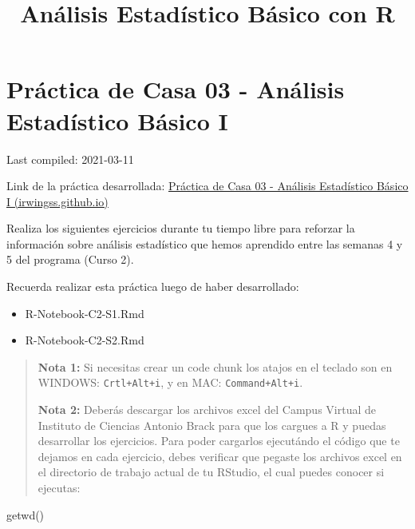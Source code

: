 \documentclass[
]{article}
\title{Análisis Estadístico Básico con R}
\author{}
\date{\vspace{-2.5em}}
\newenvironment{Shaded}{}{}
\newcommand{\FunctionTok}[1]{\textcolor[rgb]{0.02,0.16,0.49}{#1}}
\newcommand{\NormalTok}[1]{#1}
\begin{document}
\maketitle

{
\setcounter{tocdepth}{2}
\tableofcontents
}
\hypertarget{pruxe1ctica-de-casa-03---anuxe1lisis-estaduxedstico-buxe1sico-i}{%
\section{\texorpdfstring{\textbf{Práctica de Casa 03 - Análisis
Estadístico Básico
I}}{Práctica de Casa 03 - Análisis Estadístico Básico I}}\label{pruxe1ctica-de-casa-03---anuxe1lisis-estaduxedstico-buxe1sico-i}}

Last compiled: 2021-03-11

Link de la práctica desarrollada:
\href{https://irwingss.github.io/IrwingRLab/PractCasa03-full.html}{Práctica
de Casa 03 - Análisis Estadístico Básico I (irwingss.github.io)}

Realiza los siguientes ejercicios durante tu tiempo libre para reforzar
la información sobre análisis estadístico que hemos aprendido entre las
semanas 4 y 5 del programa (Curso 2).

Recuerda realizar esta práctica luego de haber desarrollado:

\begin{itemize}
\item
  R-Notebook-C2-S1.Rmd
\item
  R-Notebook-C2-S2.Rmd
\end{itemize}

\begin{quote}
\textbf{Nota 1:} Si necesitas crear un code chunk los atajos en el
teclado son en WINDOWS: \texttt{Crtl+Alt+i}, y en MAC:
\texttt{Command+Alt+i}.

\textbf{Nota 2:} Deberás descargar los archivos excel del Campus Virtual
de Instituto de Ciencias Antonio Brack para que los cargues a R y puedas
desarrollar los ejercicios. Para poder cargarlos ejecutándo el código
que te dejamos en cada ejercicio, debes verificar que pegaste los
archivos excel en el directorio de trabajo actual de tu RStudio, el cual
puedes conocer si ejecutas:
\end{quote}

\begin{Shaded}
\begin{Highlighting}[]
\FunctionTok{getwd}\NormalTok{()}
\end{Highlighting}
\end{Shaded}
\end{document}
